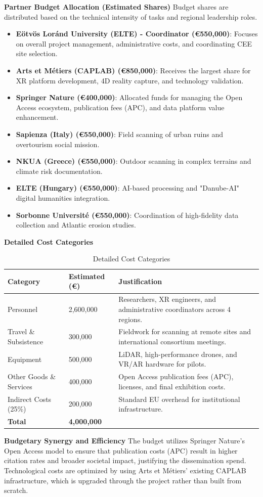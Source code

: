 \textbf{Partner Budget Allocation (Estimated Shares)}
Budget shares are distributed based on the technical intensity of tasks and regional leadership roles.
\begin{itemize}
    \item \textbf{Eötvös Loránd University (ELTE) - Coordinator (€550,000)}: Focuses on overall project management, administrative costs, and coordinating CEE site selection.
    \item \textbf{Arts et Métiers (CAPLAB) (€850,000)}: Receives the largest share for XR platform development, 4D reality capture, and technology validation.
    \item \textbf{Springer Nature (€400,000)}: Allocated funds for managing the Open Access ecosystem, publication fees (APC), and data platform value enhancement.
    \item \textbf{Sapienza (Italy) (€550,000)}: Field scanning of urban ruins and overtourism social mission.
    \item \textbf{NKUA (Greece) (€550,000)}: Outdoor scanning in complex terrains and climate risk documentation.
    \item \textbf{ELTE (Hungary) (€550,000)}: AI-based processing and "Danube-AI" digital humanities integration.
    \item \textbf{Sorbonne Université (€550,000)}: Coordination of high-fidelity data collection and Atlantic erosion studies.
\end{itemize}

\textbf{Detailed Cost Categories}
\begin{table}[h!]
    \centering
    \caption{Detailed Cost Categories}
    \label{tab:cost_categories}
    \begin{tabular}{|l|p{4cm}|p{7cm}|}
        \hline
        \textbf{Category} & \textbf{Estimated (€)} & \textbf{Justification} \\ \hline
        Personnel & 2,600,000 & Researchers, XR engineers, and administrative coordinators across 4 regions. \\ \hline
        Travel \& Subsistence & 300,000 & Fieldwork for scanning at remote sites and international consortium meetings. \\ \hline
        Equipment & 500,000 & LiDAR, high-performance drones, and VR/AR hardware for pilots. \\ \hline
        Other Goods \& Services & 400,000 & Open Access publication fees (APC), licenses, and final exhibition costs. \\ \hline
        Indirect Costs (25\%) & 200,000 & Standard EU overhead for institutional infrastructure. \\ \hline
        \textbf{Total} & \textbf{4,000,000} & \\ \hline
    \end{tabular}
\end{table}

\textbf{Budgetary Synergy and Efficiency}
The budget utilizes Springer Nature's Open Access model to ensure that publication costs (APC) result in higher citation rates and broader societal impact, justifying the dissemination spend. Technological costs are optimized by using Arts et Métiers' existing CAPLAB infrastructure, which is upgraded through the project rather than built from scratch.
